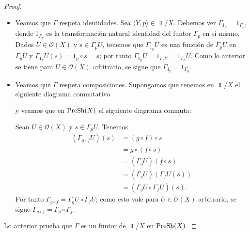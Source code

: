 \begin{proof}
   \begin{itemize}
      \item Veamos que $\Gamma$ respeta identidades. Sea $\langle Y, p\rangle\in \Top /X$. Debemos ver $\Gamma_{1_{p}}=1_{\Gamma_{p}}$, donde $1_{\Gamma_{p}}$ es la transformación natural identidad del funtor $\Gamma_p$ en sí mismo. Dados $U\in \mathcal{O}(X)$ y $s\in \Gamma_p U$, tenemos que $\Gamma_{1_p} U$ es una función de $\Gamma_p U$ en $\Gamma_p U$ y $\Gamma_{1_p}U(s)=1_p\circ s=s$; por tanto $\Gamma_{1_p}U=1_{\Gamma_p U}=1_{\Gamma_p}U$. Como lo anterior se tiene para $U\in \mathcal{O}(X)$ arbitrario, se sigue que $\Gamma_{1_p}=1_{\Gamma_p}$.
      \item Veamos que $\Gamma$ respeta composiciones. Supongamos que tenemos en $\Top /X$ el siguiente diagrama conmutativo
         
         y veamos que en $\normalfont{\text{PreSh}}(X)$ el siguiente diagrama conmuta:
         
         Sean $U\in\mathcal{O}(X)$ y $s\in\Gamma_p U$. Tenemos
         $$
         \begin{aligned}
            (\Gamma_{g\circ f}U)(s)&=(g\circ f)\circ s\\
                                   &=g\circ(f\circ s)\\
                                   &=(\Gamma_{g}U)(f\circ s)\\
                                   &=(\Gamma_{g}U)(\Gamma_{f}U(s))\\
                                   &=(\Gamma_{g}U\circ\Gamma_{f}U)(s).
         \end{aligned}
         $$
         Por tanto $\Gamma_{g\circ f}=\Gamma_{g}U\circ\Gamma_{f}U$; como esto vale para $U\in\mathcal{O}(X)$ arbitrario, se sigue $\Gamma_{g\circ f}=\Gamma_{g}\circ\Gamma_{f}$.
   \end{itemize}
   Lo anterior prueba que $\Gamma$ es un funtor de $\Top /X$ en $\normalfont{\text{PreSh}}(X)$.
\end{proof}

